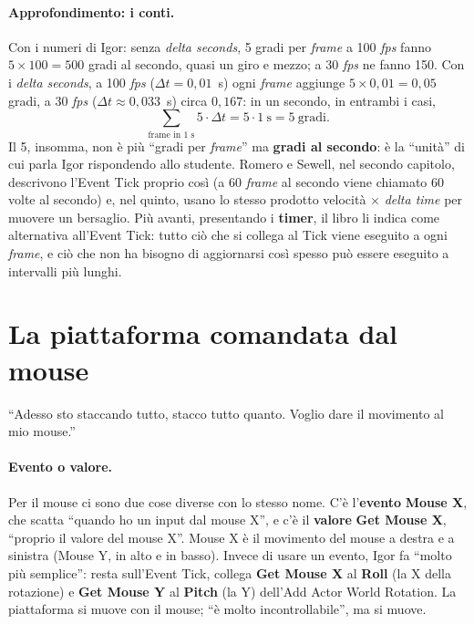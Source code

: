 \paragraph{Approfondimento: i conti.} Con i numeri di Igor: senza \emph{delta seconds},
5 gradi per \emph{frame} a 100 \emph{fps} fanno $5 \times 100 = 500$ gradi al secondo,
quasi un giro e mezzo; a 30 \emph{fps} ne fanno 150. Con i \emph{delta seconds}, a 100
\emph{fps} ($\Delta t = 0{,}01$~s) ogni \emph{frame} aggiunge $5 \times 0{,}01 = 0{,}05$
gradi, a 30 \emph{fps} ($\Delta t \approx 0{,}033$~s) circa $0{,}167$: in un secondo, in
entrambi i casi,
\[
  \sum_{\text{frame in 1 s}} 5 \cdot \Delta t = 5 \cdot 1~\text{s} = 5~\text{gradi}.
\]
Il 5, insomma, non è più ``gradi per \emph{frame}'' ma \textbf{gradi al secondo}: è la
``unità'' di cui parla Igor rispondendo allo studente. Romero e Sewell, nel secondo
capitolo, descrivono l'Event Tick proprio così (a 60 \emph{frame} al secondo viene
chiamato 60 volte al secondo) e, nel quinto, usano lo stesso prodotto velocità $\times$
\emph{delta time} per muovere un bersaglio. Più avanti, presentando i
\textbf{timer}, il libro li indica come alternativa all'Event Tick: tutto ciò che si
collega al Tick viene eseguito a ogni \emph{frame}, e ciò che non ha bisogno di
aggiornarsi così spesso può essere eseguito a intervalli più lunghi.

\section{La piattaforma comandata dal mouse}
\label{ue2:sec:mouse}

``Adesso sto staccando tutto, stacco tutto quanto. Voglio dare il movimento al mio
mouse.''

\paragraph{Evento o valore.} Per il mouse ci sono due cose diverse con lo stesso nome.
C'è l'\textbf{evento} \textbf{Mouse X}, che scatta ``quando ho un input dal mouse X'', e
c'è il \textbf{valore} \textbf{Get Mouse X}, ``proprio il valore del mouse X''. Mouse X
è il movimento del mouse a destra e a sinistra (Mouse Y, in alto e in basso). Invece di
usare un evento, Igor fa ``molto più semplice'': resta sull'Event Tick, collega
\textbf{Get Mouse X} al \textbf{Roll} (la X della rotazione) e \textbf{Get Mouse Y} al
\textbf{Pitch} (la Y) dell'Add Actor World Rotation. La piattaforma si muove con il
mouse; ``è molto incontrollabile'', ma si muove.

